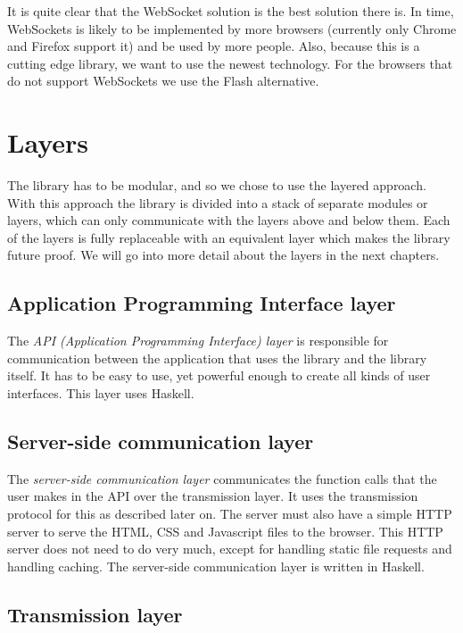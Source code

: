 \documentclass[11pt]{article}
\begin{document}
It is quite clear that the WebSocket solution is the best solution there is.
In time, WebSockets is likely to be implemented by more browsers (currently only Chrome and Firefox support it) and be used by more people.
Also, because this is a cutting edge library, we want to use the newest technology.
For the browsers that do not support WebSockets we use the Flash alternative.

\newpage
\section{Layers}

The library has to be modular, and so we chose to use the layered approach.
With this approach the library is divided into a stack of separate modules or layers, which can only communicate with the layers above and below them.
Each of the layers is fully replaceable with an equivalent layer which makes the library future proof.
We will go into more detail about the layers in the next chapters.

\subsection{Application Programming Interface layer}

The \textit{API (Application Programming Interface) layer} is responsible for communication between the application that uses the library and the library itself.
It has to be easy to use, yet powerful enough to create all kinds of user interfaces.
This layer uses Haskell.


\subsection{Server-side communication layer}

The \textit{server-side communication layer} communicates the function calls that the user makes in the API over the transmission layer.
It uses the transmission protocol for this as described later on.
The server must also have a simple HTTP server to serve the HTML, CSS and Javascript files to the browser.
This HTTP server does not need to do very much, except for handling static file requests and handling caching.
The server-side communication layer is written in Haskell.

\subsection{Transmission layer}
\end{document}
